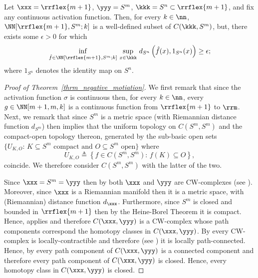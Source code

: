 \begin{theorem}\label{thrm_negative_motiation}
Let $\xxx=\rrflex{m+1}$, $\yyy=S^m$, $\kkk=S^n\subset \rrflex{m+1}$, and fix any continuous activation function.  Then, for every $k \in \nn$, $\NN[\rrflex{m+1},S^m;k]$ is a well-defined subset of $C(\kkk,S^m)$, but, there exists some $\epsilon>0$ for which
$$
\underset{
\hat{f} \in \NN[\rrflex{m+1},S^m;k]
}{\inf}\,
\sup_{x \in \kkk}\,
d_{S^n}\left(
\hat{f}(x),1_{S^n}(x)
\right)\geq \epsilon;
$$
where $1_{S^n}$ denotes the identity map on $S^n$.  
\end{theorem}

\begin{proof}[{Proof of Theorem~\ref{thrm_negative_motiation}}]
We first remark that since the activation function $\sigma$ is continuous then, for every $k\in \nn$, every $g \in \NN[m+1,m,k]$ is a continuous function from $\rrflex{m+1}$ to $\rrm$.  
Next, we remark that since $S^m$ is a metric space (with Riemannian distance function $d_{S^m}$) then \citep[Theorem 46.8]{munkres2014topology} implies that the uniform topology on $C(S^m,S^m)$ and the compact-open topology thereon, generated by the sub-basic open sets $\{U_{K,O}:\,K\subseteq S^m\mbox{ compact and } O\subseteq S^m \mbox{ open}\}$ where
$$
U_{K,O}\triangleq 
\left\{
f\in C(S^m,S^m):\,
f(K)\subseteq O
\right\},
$$
coincide.  We therefore consider $C(S^m,S^m)$ with the latter of the two.   

Since $\xxx=S^m=\yyy$ then by \citep[Example 0.3]{HatcherAlgebraicTopology} both $\xxx$ and $\yyy$ are CW-complexes (see \citep[page 5]{HatcherAlgebraicTopology}).  Moreover, since $\xxx$ is a Riemannian manifold then it is a metric space, with (Riemannian) distance function $d_{\xxx}$.  Furthermore, since $S^m$ is closed and bounded in $\rrflex{m+1}$ then by the Heine-Borel Theorem it is compact.  Hence, \citep[Corollary 2]{MilnorHomotopyTypeCWComplexMappingSpace1959} applies and therefore $C(\xxx,\yyy)$ is a CW-complex whose path components correspond the homotopy classes in $C(\xxx,\yyy)$.  By \citep[Proposition A.4]{HatcherAlgebraicTopology} every CW-complex is locally-contractible and therefore (see \citep[page 522]{HatcherAlgebraicTopology}) it is locally path-connected.  Hence, by \citep[Theorem 25.5]{munkres2014topology} every path component of $C(\xxx,\yyy)$ is a connected component and therefore every path component of $C(\xxx,\yyy)$ is closed.  Hence, every homotopy class in $C(\xxx,\yyy)$ is closed.  


\end{proof}
